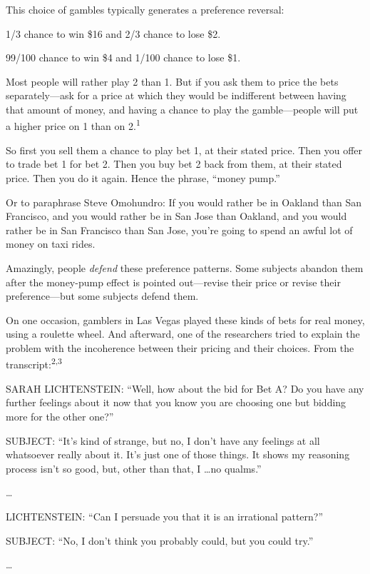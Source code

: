 {
 This choice of gambles typically generates a preference reversal:}

{
 1/3 chance to win \$16 and 2/3 chance to lose \$2.}

{
 99/100 chance to win \$4 and 1/100 chance to lose \$1.}

{
 Most people will rather play 2 than 1. But if you ask them to
price the bets separately---ask for a price at which they would be
indifferent between having that amount of money, and having a chance to
play the gamble---people will put a higher price on 1 than on
2.\textsuperscript{1}}

{
 So first you sell them a chance to play bet 1, at their stated
price. Then you offer to trade bet 1 for bet 2. Then you buy bet 2 back
from them, at their stated price. Then you do it again. Hence the
phrase, ``money pump.''}

{
 Or to paraphrase Steve Omohundro: If you would rather be in
Oakland than San Francisco, and you would rather be in San Jose than
Oakland, and you would rather be in San Francisco than San Jose,
you're going to spend an awful lot of money on taxi
rides.}

{
 Amazingly, people \textit{defend} these preference patterns. Some
subjects abandon them after the money-pump effect is pointed
out---revise their price or revise their preference---but some subjects
defend them.}

{
 On one occasion, gamblers in Las Vegas played these kinds of bets
for real money, using a roulette wheel. And afterward, one of the
researchers tried to explain the problem with the incoherence between
their pricing and their choices. From the
transcript:\textsuperscript{2,3}}

{
 SARAH LICHTENSTEIN: ``Well, how about the bid for
Bet A? Do you have any further feelings about it now that you know you
are choosing one but bidding more for the other
one?''}

{
 SUBJECT: ``It's kind of strange,
but no, I don't have any feelings at all whatsoever
really about it. It's just one of those things. It
shows my reasoning process isn't so good, but, other
than that, I \ldots no qualms.''}

{
 \ldots}

{
 LICHTENSTEIN: ``Can I persuade you that it is an
irrational pattern?''}

{
 SUBJECT: ``No, I don't think you
probably could, but you could try.''}

{
 \ldots}

